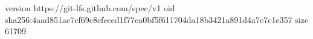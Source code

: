 version https://git-lfs.github.com/spec/v1
oid sha256:4aad851ae7cf69c8cfeeed1f77ca0bf5f611704da18b3421a891d4a7c7c1e357
size 61709
